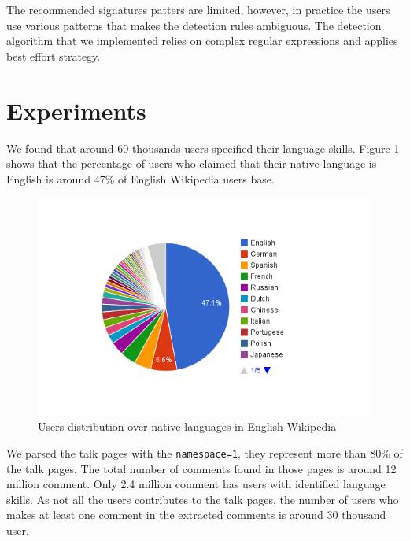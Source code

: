 \documentclass[10pt,a5paper,twoside]{article}
\begin{document}
The recommended signatures patters are limited, however, in practice the users
use various patterns that makes the detection rules ambiguous. The detection
algorithm that we implemented relies on complex regular expressions and applies best effort strategy.

\section{Experiments}
\label{exps}
We found that around 60 thousands users specified their language skills. Figure \ref{native_dist} shows that the percentage of users who claimed that their native language is English is around 47\% of English Wikipedia users base.

\begin{figure}
  \centering
\includegraphics[scale=0.36]{chart_4.png}
\caption{Users distribution over native languages in English Wikipedia}
\label{native_dist}
\end{figure}

We parsed the talk pages with the \verb+namespace=1+, they represent more than
80\% of the talk pages. The total number of comments found in those pages is
around 12 million comment. Only 2.4 million comment has users with identified language skills. As not all the users contributes to the talk pages, the number of users who makes at least one comment in the extracted comments is around 30 thousand user.
\end{document}
